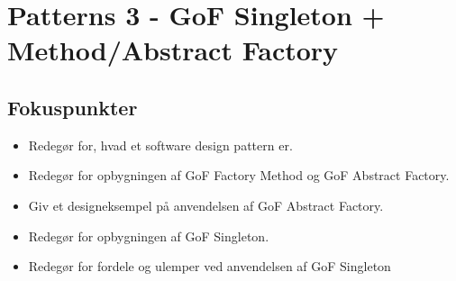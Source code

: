 \section{Patterns 3 - GoF Singleton + Method/Abstract Factory}

\subsection{Fokuspunkter}

\begin{itemize}
	\item Redegør for, hvad et software design pattern er.
	\item Redegør for opbygningen af GoF Factory Method og GoF Abstract Factory.
	\item Giv et designeksempel på anvendelsen af GoF Abstract Factory.
	\item Redegør for opbygningen af GoF Singleton.
	\item Redegør for fordele og ulemper ved anvendelsen af GoF Singleton
\end{itemize}

